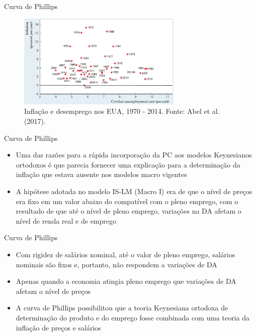 \documentclass[10pt]{beamer}
\begin{document}
\begin{frame}{Curva de Phillips}
    \begin{figure}
        \centering
        \includegraphics[width=0.7\textwidth]{./figures/aula8_fig9.JPG}
        \caption{Inflação e desemprego nos EUA, 1970 - 2014. Fonte: Abel et al. (2017).}
        \label{fig14}
    \end{figure}
\end{frame}

\begin{frame}{Curva de Phillips}
    \begin{itemize}
        \item Uma das razões para a rápida incorporação da PC aos modelos Keynesianos ortodoxos é que parecia fornecer uma explicação para a determinação da inflação que estava ausente nos modelos macro vigentes
        \bigskip
        \item A hipótese adotada no modelo IS-LM (Macro I) era de que o nível de preços era fixo em um valor abaixo do compatível com o pleno emprego, com o resultado de que até o nível de pleno emprego, variações na DA afetam o nível de renda real e de emprego
    \end{itemize}
\end{frame}

\begin{frame}{Curva de Phillips}
    \begin{itemize}
        \item Com rigidez de salários nominal, até o valor de pleno emprego, salários nominais são fixos e, portanto, não respondem a variações de DA
        \bigskip
        \item Apenas quando a economia atingia pleno emprego que variações de DA afetam o nível de preços
        \bigskip
        \item A curva de Phillips possibilitou que a teoria Keynesiana ortodoxa de determinação do produto e do emprego fosse combinada com uma teoria da inflação de preços e salários
    \end{itemize}
\end{frame}
\end{document}
